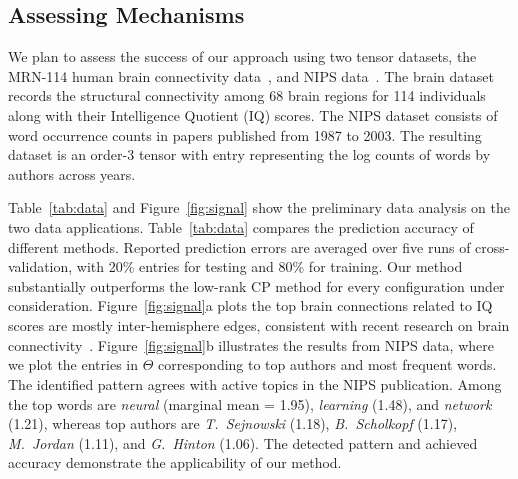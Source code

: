 \documentclass[11pt]{article}
\theoremstyle{exampstyle}
\theoremstyle{definition}
\begin{document}
  \vspace{-.3cm}
\subsection{Assessing Mechanisms}
  \vspace{-.3cm}
We plan to assess the success of our approach using two tensor datasets, the MRN-114 human brain connectivity data~\cite{wang2017bayesian}, and NIPS data~\cite{globerson2007euclidean}. The brain dataset records the structural connectivity among 68 brain regions for 114 individuals along with their Intelligence Quotient (IQ) scores. The NIPS dataset consists of word occurrence counts in papers published from 1987 to 2003. The resulting dataset is an order-3 tensor with entry representing the log counts of words by authors across years. 

Table~\ref{tab:data} and Figure~\ref{fig:signal} show the preliminary data analysis on the two data applications. Table~\ref{tab:data} compares the prediction accuracy of different methods. Reported prediction errors are averaged over five runs of cross-validation, with 20\% entries for testing and 80\% for training. Our method substantially outperforms the low-rank CP method for every configuration under consideration. Figure~\ref{fig:signal}a plots the top brain connections related to IQ scores are mostly inter-hemisphere edges, consistent with recent research on brain connectivity~\cite{wang2017bayesian}. Figure~\ref{fig:signal}b illustrates the results from NIPS data, where we plot the entries in $\hat \Theta$ corresponding to top authors and most frequent words. The identified pattern agrees with active topics in the NIPS publication. Among the top words are \emph{neural} (marginal mean = 1.95), \emph{learning} (1.48), and \emph{network} (1.21), whereas top authors are \emph{T.\ Sejnowski} (1.18), \emph{B.~Scholkopf} (1.17), \emph{M.\ Jordan} (1.11), and \emph{G.\ Hinton} (1.06). The detected pattern and achieved accuracy demonstrate the applicability of our method.
\end{document}
